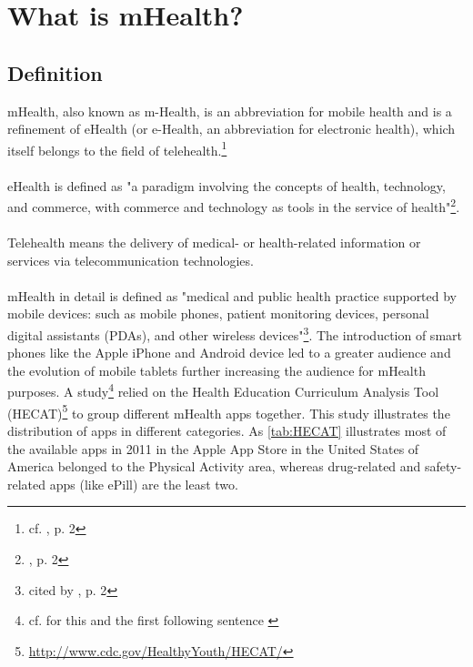 \section{What is mHealth?}
\subsection{Definition}
mHealth, also known as m-Health, is an abbreviation for mobile health and is a refinement of eHealth (or e-Health, an abbreviation for electronic health), which itself belongs to the field of telehealth.\footnote{cf. \cite{MartinezPerez.2013}, p. 2}
\\
\\
eHealth is defined as "a paradigm involving the concepts of health, technology, and commerce, with commerce and technology as tools in the service of health"\footnote{\cite{MartinezPerez.2013}, p. 2}.
\\
\\
Telehealth means the delivery of medical- or health-related information or services via telecommunication technologies.
\\
\\
mHealth in detail is defined as "medical and public health practice supported by mobile devices: such as mobile phones, patient monitoring devices, personal digital assistants (PDAs), and other wireless devices"\footnote{\cite{WorldHealthOrganization.2011} cited by \cite{MartinezPerez.2013}, p. 2}. The introduction of smart phones like the Apple iPhone and Android device led to a greater audience and the evolution of mobile tablets further increasing the audience for mHealth purposes. A study\footnote{cf. for this and the first following sentence \cite{West.2012}} relied on the Health Education Curriculum Analysis Tool (HECAT)\footnote{\url{http://www.cdc.gov/HealthyYouth/HECAT/}} to group different mHealth apps together. This study illustrates the distribution of apps in different categories. As \ref{tab:HECAT} illustrates most of the available apps in 2011 in the Apple App Store in the United States of America belonged to the Physical Activity area, whereas drug-related and safety-related apps (like ePill) are the least two. 
